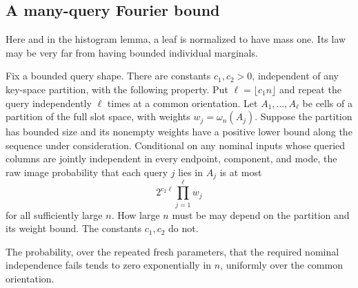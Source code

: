 \subsection{A many-query Fourier bound}

Here and in the histogram lemma, a leaf is normalized to have mass one.
Its law may be very far from having bounded individual marginals.

\begin{lemma}
\label{lem:histogram-many-queries}
Fix a bounded query shape. There are constants $c_1,c_2>0$, independent
of any key-space partition, with the following property. Put
$\ell=\lfloor c_1n\rfloor$ and repeat the query independently $\ell$
times at a common orientation. Let $A_1,\ldots,A_\ell$ be cells of a
partition of the full slot space, with weights
$w_j=\omega_n(A_j)$. Suppose the partition has bounded size and its
nonempty weights have a positive lower bound along the sequence under
consideration. Conditional on any nominal inputs whose queried columns
are jointly independent in every endpoint, component, and mode, the
raw image probability that each query $j$ lies in $A_j$ is at most
\begin{equation}\label{eq:histogram-many-query-bound}
 2^{c_2\ell}\prod_{j=1}^{\ell}w_j
\end{equation}
for all sufficiently large $n$. How large $n$ must be may depend on the
partition and its weight bound. The constants $c_1,c_2$ do not.

The probability, over the repeated fresh parameters, that the required
nominal independence fails tends to zero exponentially in $n$, uniformly
over the common orientation.
\end{lemma}

